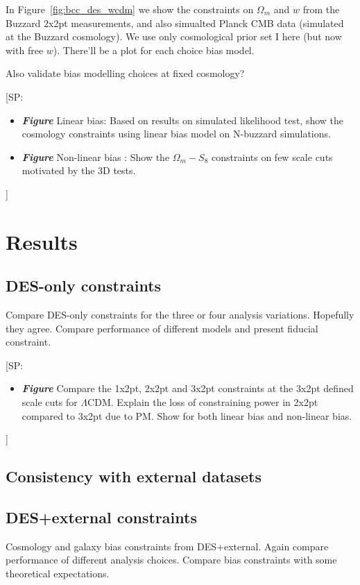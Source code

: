 \documentclass[fleqn,usenatbib]{mnras}
\newcommand\fig[1]{Figure~\ref{#1}}
\newcommand{\SP}[1]{{\color{brown}[SP: #1]}}
\begin{document}
In \fig{fig:bcc_des_wcdm} we show the constraints on $\Omega_m$ and $w$ from the Buzzard 2x2pt measurements, and also simualted Planck CMB data (simulated at the Buzzard cosmology). We use only cosmological prior set I here (but now with free $w$). There'll be a plot for each choice bias model.

Also validate bias modelling choices at fixed cosmology?

\SP{
\begin{itemize}
    \item \textbf{\textit{Figure}} Linear bias: Based on results on simulated likelihood test, show the cosmology constraints using linear bias model on N-buzzard simulations. 
    \item \textbf{\textit{Figure}} Non-linear bias : Show the $\Omega_m - S_8$ constraints on few scale cuts motivated by the 3D tests. 
\end{itemize}
}


\section{Results}

\subsection{DES-only constraints}

Compare DES-only constraints for the three or four analysis variations. Hopefully they agree. Compare performance of different models and present fiducial constraint.

\SP{\begin{itemize}
    \item \textbf{\textit{Figure}} Compare the 1x2pt, 2x2pt and 3x2pt constraints at the 3x2pt defined scale cuts for $\Lambda$CDM. Explain the loss of constraining power in 2x2pt compared to 3x2pt due to PM. Show for both linear bias and non-linear bias. 
\end{itemize}
}

\subsection{Consistency with external datasets}

\subsection{DES+external constraints}

Cosmology and galaxy bias constraints from DES+external. Again compare performance of different analysis choices. Compare bias constraints with some theoretical expectations.
\end{document}
